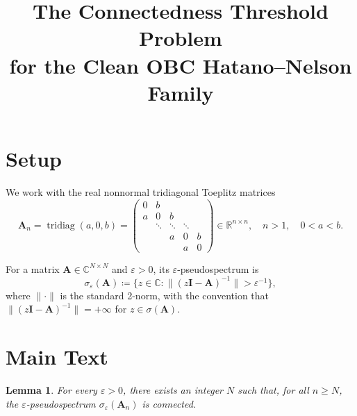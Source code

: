 \documentclass[11pt]{article}
\title{The Connectedness Threshold Problem\\
for the Clean OBC Hatano--Nelson Family}
\author{}
\date{}
\newtheorem{lemma}[theorem]{Lemma}
\begin{document}
\maketitle

\section{Setup}

We work with the real nonnormal tridiagonal Toeplitz matrices
\[
\mathbf{A}_n=\operatorname{tridiag}(a,0,b)
=\begin{pmatrix}
0 & b \\
a & 0 & b \\
& \ddots & \ddots & \ddots \\
&& a & 0 & b \\
&&& a & 0
\end{pmatrix}
\in\mathbb{R}^{n\times n},
\quad n>1, \quad 0<a<b.
\]

For a matrix $\mathbf{A}\in\mathbb{C}^{N\times N}$ and $\varepsilon>0$, its $\varepsilon$-pseudospectrum is
\[
\sigma_\varepsilon(\mathbf{A})\coloneqq\{z\in\mathbb{C}\colon\|(z\mathbf{I}-\mathbf{A})^{-1}\|>\varepsilon^{-1}\},
\]
where $\|\cdot\|$ is the standard 2-norm, with the convention that
$\|(z\mathbf{I}-\mathbf{A})^{-1}\|=+\infty$ for $z\in\sigma(\mathbf{A})$.

\section{Main Text}

\begin{lemma}\label{lem:eventual-connectedness}
For every $\varepsilon>0$, there exists an integer $N$ such that, for all
$n\ge N$, the $\varepsilon$-pseudospectrum $\sigma_\varepsilon(\mathbf{A}_n)$ is connected.
\end{lemma}
\end{document}
